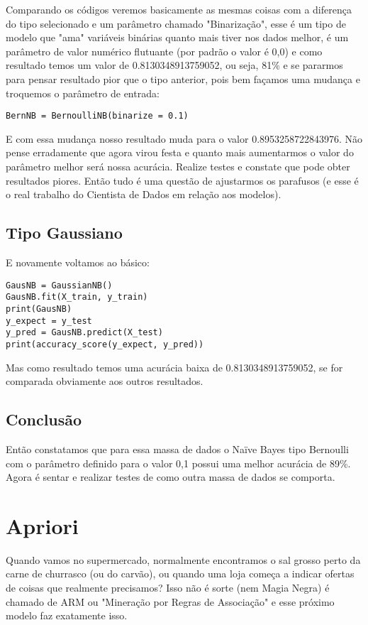 Comparando os códigos veremos basicamente as mesmas coisas com a diferença do tipo selecionado e um parâmetro chamado "Binarização", esse é um tipo de modelo que "ama" variáveis binárias quanto mais tiver nos dados melhor, é um parâmetro de valor numérico flutuante (por padrão o valor é 0,0) e como resultado temos um valor de 0.8130348913759052, ou seja, 81\% e se pararmos para pensar resultado pior que o tipo anterior, pois bem façamos uma mudança e troquemos o parâmetro de entrada:
\begin{lstlisting}[]
BernNB = BernoulliNB(binarize = 0.1)
\end{lstlisting}

E com essa mudança nosso resultado muda para o valor 0.8953258722843976. Não pense erradamente que agora virou festa e quanto mais aumentarmos o valor do parâmetro melhor será nossa acurácia. Realize testes e constate que pode obter resultados piores. Então tudo é uma questão de ajustarmos os parafusos (e esse é o real trabalho do Cientista de Dados em relação aos modelos).

\subsection{Tipo Gaussiano}
E novamente voltamos ao básico:
\begin{lstlisting}[]
GausNB = GaussianNB()
GausNB.fit(X_train, y_train)
print(GausNB)
y_expect = y_test
y_pred = GausNB.predict(X_test)
print(accuracy_score(y_expect, y_pred))
\end{lstlisting}

Mas como resultado temos uma acurácia baixa de 0.8130348913759052, se for comparada obviamente aos outros resultados.

\subsection{Conclusão}
Então constatamos que para essa massa de dados o Naïve Bayes tipo Bernoulli com o parâmetro definido para o valor 0,1 possui uma melhor acurácia de 89\%. Agora é sentar e realizar testes de como outra massa de dados se comporta.

\section{Apriori}
Quando vamos no supermercado, normalmente encontramos o sal grosso perto da carne de churrasco (ou do carvão), ou quando uma loja começa a indicar ofertas de coisas que realmente precisamos? Isso não é sorte (nem Magia Negra) é chamado de ARM ou "Mineração por Regras de Associação" e esse próximo modelo faz exatamente isso.

